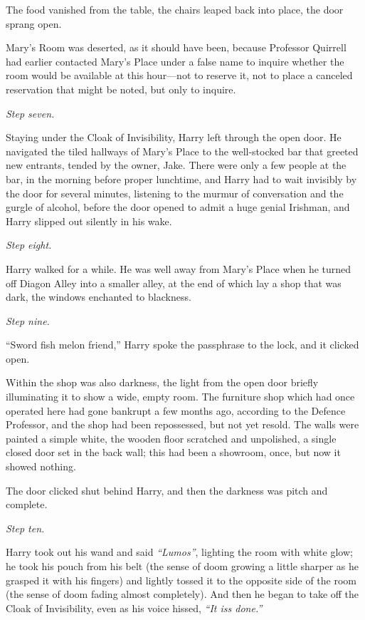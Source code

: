 The food vanished from the table, the chairs leaped back into place, the
door sprang open.

Mary's Room was deserted, as it should have been, because Professor
Quirrell had earlier contacted Mary's Place under a false name to
inquire whether the room would be available at this hour---not to
reserve it, not to place a canceled reservation that might be noted, but
only to inquire.

\emph{Step seven.}

Staying under the Cloak of Invisibility, Harry left through the open
door. He navigated the tiled hallways of Mary's Place to the
well-stocked bar that greeted new entrants, tended by the owner, Jake.
There were only a few people at the bar, in the morning before proper
lunchtime, and Harry had to wait invisibly by the door for several
minutes, listening to the murmur of conversation and the gurgle of
alcohol, before the door opened to admit a huge genial Irishman, and
Harry slipped out silently in his wake.

\emph{Step eight.}

Harry walked for a while. He was well away from Mary's Place when he
turned off Diagon Alley into a smaller alley, at the end of which lay a
shop that was dark, the windows enchanted to blackness.

\emph{Step nine.}

``Sword fish melon friend,'' Harry spoke the passphrase to the lock, and
it clicked open.

Within the shop was also darkness, the light from the open door briefly
illuminating it to show a wide, empty room. The furniture shop which had
once operated here had gone bankrupt a few months ago, according to the
Defence Professor, and the shop had been repossessed, but not yet
resold. The walls were painted a simple white, the wooden floor
scratched and unpolished, a single closed door set in the back wall;
this had been a showroom, once, but now it showed nothing.

The door clicked shut behind Harry, and then the darkness was pitch and
complete.

\emph{Step ten.}

Harry took out his wand and said \emph{``Lumos''}, lighting the room
with white glow; he took his pouch from his belt (the sense of doom
growing a little sharper as he grasped it with his fingers) and lightly
tossed it to the opposite side of the room (the sense of doom fading
almost completely). And then he began to take off the Cloak of
Invisibility, even as his voice hissed, \emph{``It iss done.''}

